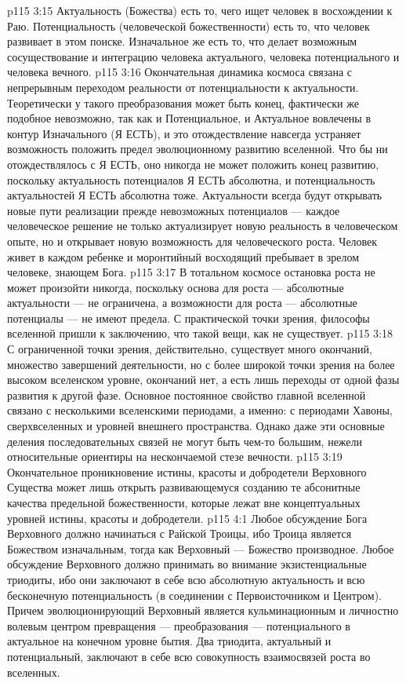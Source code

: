 \vs p115 3:15 Актуальность (Божества) есть то, чего ищет человек в восхождении к Раю. Потенциальность (человеческой божественности) есть то, что человек развивает в этом поиске. Изначальное же есть то, что делает возможным сосуществование и интеграцию человека актуального, человека потенциального и человека вечного.
\vs p115 3:16 \pc Окончательная динамика космоса связана с непрерывным переходом реальности от потенциальности к актуальности. Теоретически у такого преобразования может быть конец, фактически же подобное невозможно, так как и Потенциальное, и Актуальное вовлечены в контур Изначального (Я ЕСТЬ), и это отождествление навсегда устраняет возможность положить предел эволюционному развитию вселенной. Что бы ни отождествлялось с Я ЕСТЬ, оно никогда не может положить конец развитию, поскольку актуальность потенциалов Я ЕСТЬ абсолютна, и потенциальность актуальностей Я ЕСТЬ абсолютна тоже. Актуальности всегда будут открывать новые пути реализации прежде невозможных потенциалов --- каждое человеческое решение не только актуализирует новую реальность в человеческом опыте, но и открывает новую возможность для человеческого роста. Человек живет в каждом ребенке и моронтийный восходящий пребывает в зрелом человеке, знающем Бога.
\vs p115 3:17 В тотальном космосе остановка роста не может произойти никогда, поскольку основа для роста --- абсолютные актуальности --- не ограничена, а возможности для роста --- абсолютные потенциалы --- не имеют предела. С практической точки зрения, философы вселенной пришли к заключению, что такой вещи, как  не существует.
\vs p115 3:18 С ограниченной точки зрения, действительно, существует много окончаний, множество завершений деятельности, но с более широкой точки зрения на более высоком вселенском уровне, окончаний нет, а есть лишь переходы от одной фазы развития к другой фазе. Основное постоянное свойство главной вселенной связано с несколькими вселенскими периодами, а именно: с периодами Хавоны, сверхвселенных и уровней внешнего пространства. Однако даже эти основные деления последовательных связей не могут быть чем\hyp{}то большим, нежели относительные ориентиры на нескончаемой стезе вечности.
\vs p115 3:19 Окончательное проникновение истины, красоты и добродетели Верховного Существа может лишь открыть развивающемуся созданию те абсонитные качества предельной божественности, которые лежат вне концептуальных уровней истины, красоты и добродетели.
\vs p115 4:1 Любое обсуждение  Бога Верховного должно начинаться с Райской Троицы, ибо Троица является Божеством изначальным, тогда как Верховный --- Божество производное. Любое обсуждение  Верховного должно принимать во внимание экзистенциальные триодиты, ибо они заключают в себе всю абсолютную актуальность и всю бесконечную потенциальность (в соединении с Первоисточником и Центром). Причем эволюционирующий Верховный является кульминационным и личностно волевым центром превращения --- преобразования --- потенциального в актуальное на конечном уровне бытия. Два триодита, актуальный и потенциальный, заключают в себе всю совокупность взаимосвязей роста во вселенных.

